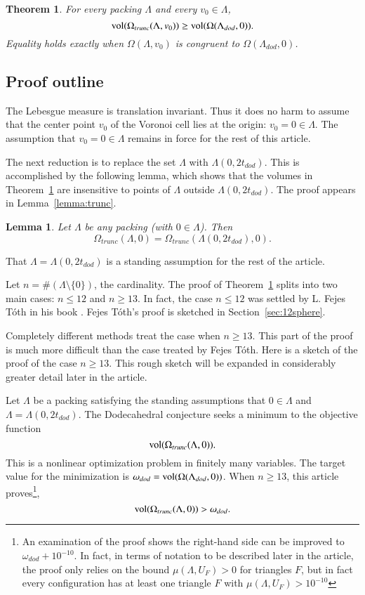 \documentclass{article} %
\newtheorem{theorem}{Theorem}[section]
\newtheorem{lemma}{Lemma}[subsection]
\begin{document}
\begin{theorem}\label{thm:dodec}
  For every packing $\Lambda$ and every $v_0\in\Lambda$,
  $$
  {\operatorname{vol}}(\Omega_{trunc}(\Lambda,v_0))\ge {\operatorname{vol}}(\Omega(\Lambda_{dod},0)).
  $$
  Equality holds exactly when $\Omega(\Lambda,v_0)$ is congruent to
  $\Omega(\Lambda_{dod},0)$.
\end{theorem}

\subsection{Proof outline}

The Lebesgue measure is translation invariant. Thus it does no harm to
assume that the center point $v_0$ of the Voronoi cell lies at the
origin: $v_0 = 0 \in \Lambda$. The assumption that $v_0=0 \in\Lambda$
remains in force for the rest of this article.

The next reduction is to replace the set $\Lambda$ with
$\Lambda(0,2t_{dod})$. This is accomplished by the following lemma,
which shows that the volumes in Theorem~\ref{thm:dodec} are
insensitive to points of $\Lambda$ outside $\Lambda(0,2t_{dod})$. The
proof appears in Lemma~\ref{lemma:trunc}.

\begin{lemma} 
  Let $\Lambda$ be any packing (with $0\in \Lambda$). Then
  $$\Omega_{trunc}(\Lambda,0) = \Omega_{trunc}(\Lambda(0,2t_{dod}),0).$$
\end{lemma}

That $\Lambda=\Lambda(0,2t_{dod})$ is a standing assumption for the
rest of the article.

Let $n=\#(\Lambda\setminus\{0\})$, the cardinality. The proof of
Theorem~\ref{thm:dodec} splits into two main cases: $n\le 12$ and
$n\ge 13$. In fact, the case $n\le 12$ was settled by L. Fejes T\'oth
in his book \cite{Toth:1964:Regular}. Fejes T\'oth's proof is sketched
in Section~\ref{sec:12sphere}.

Completely different methods treat the case when $n\ge 13$. This part
of the proof is much more difficult than the case treated by Fejes
T\'oth. Here is a sketch of the proof of the case $n\ge 13$. This
rough sketch will be expanded in considerably greater detail later in
the article.

Let $\Lambda$ be a packing satisfying the standing assumptions that
$0\in\Lambda$ and $\Lambda = \Lambda(0,2t_{dod})$. The Dodecahedral
conjecture seeks a minimum to the objective function
$$
{\operatorname{vol}}(\Omega_{trunc}(\Lambda,0)).
$$
This is a nonlinear optimization problem in finitely many variables.
The target value for the minimization is $\omega_{dod}={\operatorname{vol}}(\Omega(\Lambda_{dod},0))$.  When $n\ge 13$, this article proves\footnote{An examination of the proof shows the right-hand side can be improved to $\omega_{dod}+10^{-10}$.  In fact, in terms of notation to be described later in the article, the proof only
relies on the bound $\mu(\Lambda,U_F) >0$ for triangles $F$, but in fact every configuration has at least one triangle $F$ with $\mu(\Lambda,U_F) > 10^{-10}$},
$$
{\operatorname{vol}}(\Omega_{trunc}(\Lambda,0))  > \omega_{dod}.
$$
\end{document}
